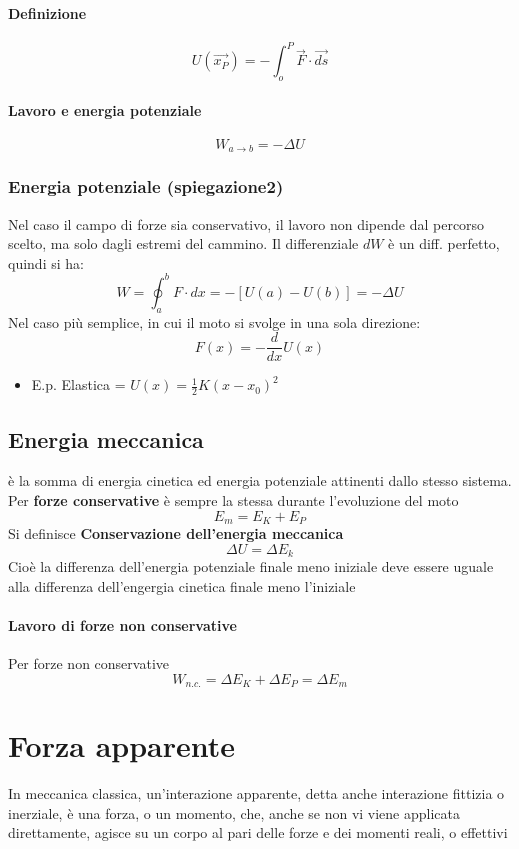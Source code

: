 \documentclass[a4paper]{report}
\begin{document}
  \paragraph{Definizione}
  $$ U(\vec{x_P}) = - \int_o^P \vec{F}\cdot \vec{ds} $$
  \paragraph{Lavoro e energia potenziale}
  $$ W_{a\rightarrow b} = -\Delta U $$

  \subsubsection{Energia potenziale (spiegazione2)}
  Nel caso il campo di forze sia conservativo, il lavoro non dipende dal percorso scelto, ma solo dagli estremi del cammino. Il differenziale $dW$ è un diff. perfetto, quindi si ha:
  $$W = \oint_a^b F \cdot dx = -[U(a) - U(b)] = -\Delta U$$
  Nel caso più semplice, in cui il moto si svolge in una sola direzione:
  $$ F(x) = -\frac{d}{dx}U(x) $$
  \begin{itemize}
    \item E.p. Elastica = \( U(x) = \frac{1}{2} K (x-x_0 )^2 \)
  \end{itemize}

  \subsection{Energia meccanica}
  è la somma di energia cinetica ed energia potenziale attinenti dallo stesso sistema.\\
  Per \textbf{forze conservative} è sempre la stessa durante l'evoluzione del moto
  $$ E_m = E_K + E_P $$
  Si definisce \textbf{Conservazione dell'energia meccanica}
  $$ \Delta U = \Delta E_k$$
  Cioè la differenza dell'energia potenziale finale meno iniziale  deve essere uguale alla differenza dell'engergia cinetica finale meno l'iniziale
  \paragraph{Lavoro di forze non conservative}
  Per forze non conservative
  $$ W_{n.c.} = \Delta E_K + \Delta E_P = \Delta E_m $$

  \section{Forza apparente}
  In meccanica classica, un'interazione apparente, detta anche interazione fittizia o inerziale, è una forza, o un momento, che, anche se non vi viene applicata direttamente, agisce su un corpo al pari delle forze e dei momenti reali, o effettivi
\end{document}
